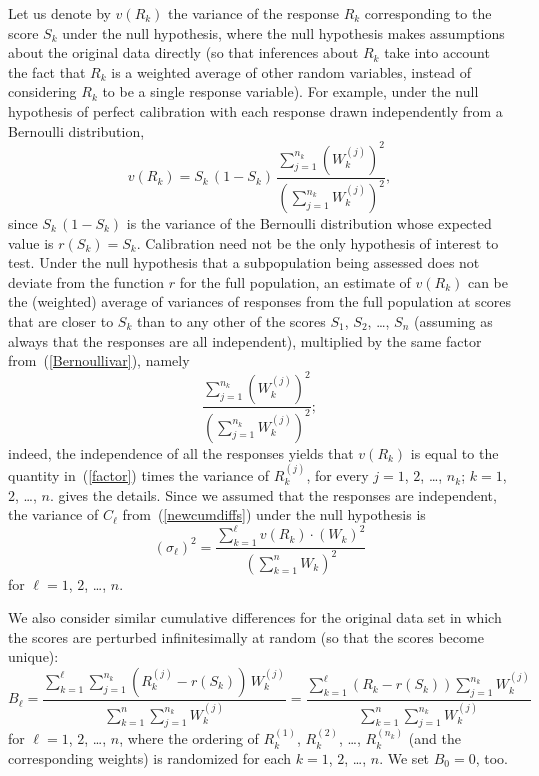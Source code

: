 \documentclass[12pt]{article}
\begin{document}
Let us denote by $v(R_k)$ the variance of the response $R_k$
corresponding to the score $S_k$ under the null hypothesis,
where the null hypothesis makes assumptions about the original data directly
(so that inferences about $R_k$ take into account the fact that $R_k$
is a weighted average of other random variables, instead of considering $R_k$
to be a single response variable).
For example, under the null hypothesis of perfect calibration
with each response drawn independently from a Bernoulli distribution,
%
\begin{equation}
\label{Bernoullivar}
v(R_k) = S_k \, (1 - S_k) \, \frac{\sum_{j=1}^{n_k} \left(W_k^{(j)}\right)^2}
                                  {\left(\sum_{j=1}^{n_k} W_k^{(j)}\right)^2},
\end{equation}
%
since $S_k \, (1 - S_k)$ is the variance
of the Bernoulli distribution whose expected value is $r(S_k) = S_k$.
Calibration need not be the only hypothesis of interest to test.
Under the null hypothesis that a subpopulation being assessed does not deviate
from the function $r$ for the full population,
an estimate of $v(R_k)$ can be the (weighted) average of variances of responses
from the full population at scores that are closer to $S_k$
than to any other of the scores $S_1$, $S_2$, \dots, $S_n$
(assuming as always that the responses are all independent),
multiplied by the same factor from~(\ref{Bernoullivar}), namely
%
\begin{equation}
\label{factor}
\frac{\sum_{j=1}^{n_k} \left(W_k^{(j)}\right)^2}
     {\left(\sum_{j=1}^{n_k} W_k^{(j)}\right)^2};
\end{equation}
%
indeed, the independence of all the responses yields that $v(R_k)$
is equal to the quantity in~(\ref{factor}) times the variance of $R_k^{(j)}$,
for every $j = 1$, $2$, \dots, $n_k$; $k = 1$, $2$, \dots, $n$.
\cite{tygert_full} gives the details.
Since we assumed that the responses are independent, the variance
of $C_{\ell}$ from~(\ref{newcumdiffs}) under the null hypothesis is
%
\begin{equation}
\label{total}
(\sigma_{\ell})^2 = \frac{\sum_{k=1}^{\ell} v(R_k) \cdot (W_k)^2}
                         {(\sum_{k=1}^n W_k)^2}
\end{equation}
%
for $\ell = 1$, $2$, \dots, $n$.

We also consider similar cumulative differences for the original data set
in which the scores are perturbed infinitesimally at random
(so that the scores become unique):
%
\begin{equation}
\label{cumdiffs}
B_{\ell} = \frac{\sum_{k=1}^{\ell} \sum_{j=1}^{n_k}
                 \left(R_k^{(j)} - r(S_k)\right) \, W_k^{(j)}}
                {\sum_{k=1}^n \sum_{j=1}^{n_k} W_k^{(j)}}
         = \frac{\sum_{k=1}^{\ell} (R_k - r(S_k)) \sum_{j=1}^{n_k} W_k^{(j)}}
                {\sum_{k=1}^n \sum_{j=1}^{n_k} W_k^{(j)}}
\end{equation}
%
for $\ell = 1$, $2$, \dots, $n$,
where the ordering of $R_k^{(1)}$, $R_k^{(2)}$, \dots, $R_k^{(n_k)}$
(and the corresponding weights) is randomized
for each $k = 1$, $2$, \dots, $n$. We set $B_0 = 0$, too.
\end{document}
